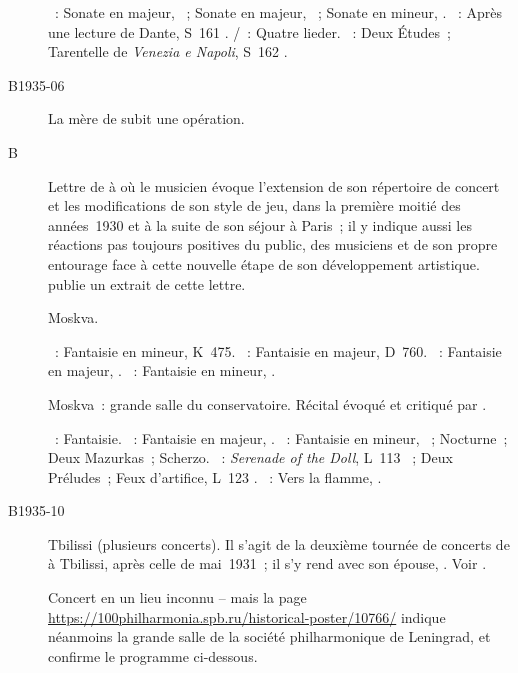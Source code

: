 \begin{description}
 \textsc{\Beethoven{}}~: Sonate en \kD majeur, ~; Sonate en \kF
 \Sharp majeur, ~; Sonate en \kC \Sharp mineur, 
 .
 \textsc{\Liszt{}}~: Après une lecture de Dante, S~161 .
 \textsc{\Schubert{}/\Liszt{}}~: Quatre lieder.
 \textsc{\Liszt{}}~: Deux Études~; Tarentelle de \emph{Venezia e Napoli},
 S~162 .
 \item[B1935-06]
 La mère de \VSofronitsky{} subit une opération.
 \item[B\DateWithWeekDay{1935-07-07}]
 Lettre de \VSofronitsky{} à \AVizel{} où le musicien évoque l'extension de
 son répertoire de concert et les modifications de son style de jeu, dans la
 première moitié des années~1930 et à la suite de son séjour à Paris~; il y
 indique aussi les réactions pas toujours positives du public, des musiciens
 et de son propre entourage face à cette nouvelle étape de son développement
 artistique.
 \citet[p.~156]{Nekrasova08} publie un extrait de cette lettre.
 \item[\DateWithWeekDay{1935-09-17}]
 Moskva.

 \textsc{\Mozart{}}~: Fantaisie en \kC mineur, K~475.
 \textsc{\Schubert{}}~: Fantaisie  en \kC majeur, D~760.
 \textsc{\Schumann{}}~: Fantaisie en \kC majeur, .
 \textsc{\Chopin{}}~: Fantaisie en \kF mineur, .
 \item[\DateWithWeekDay{1935-09-18}]
 Moskva~: grande salle du conservatoire.
 Récital évoqué et critiqué par \citet{Drozdov35}.

 \textsc{\Mozart{}}~: Fantaisie.
 \textsc{\Schumann{}}~: Fantaisie en \kC majeur, .
 \textsc{\Chopin{}}~: Fantaisie en \kF mineur, ~; Nocturne~; Deux
 Mazurkas~; Scherzo.
 \textsc{\Debussy{}}~: \emph{Serenade of the Doll}, L~113 ~;
 Deux Préludes~; Feux d'artifice, L~123 .
 \textsc{\Scriabine{}}~: Vers la flamme, .
 \item[B1935-10]
 Tbilissi (plusieurs concerts).
 Il s'agit de la deuxième tournée de concerts de \VSofronitsky{} à Tbilissi,
 après celle de mai~1931~; il s'y rend avec son épouse, \ESofronitskaya{}.
 Voir \citet[p.~157]{Nekrasova08}.
 \item[\DateWithWeekDay{1935-10-19}]
 Concert en un lieu inconnu -- mais la page
 \href{https://100philharmonia.spb.ru/historical-poster/10766/}%
 {https://100philharmonia.spb.ru/historical-poster/10766/} indique néanmoins
 la grande salle de la société philharmonique de Leningrad, et confirme le
 programme ci-dessous.


\end{description}
